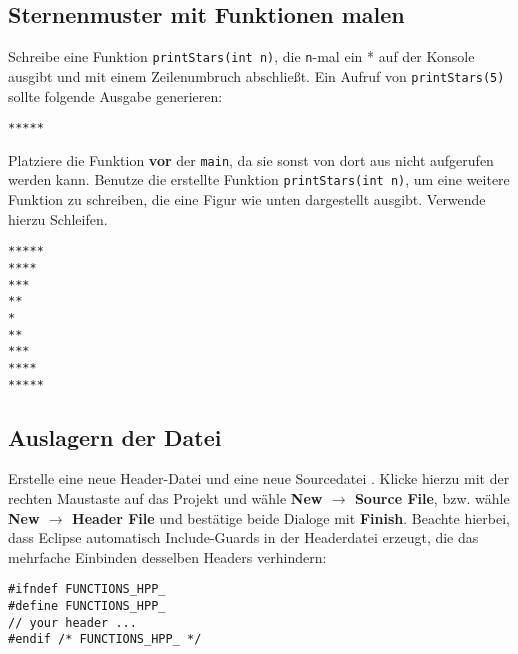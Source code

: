 \subsection{Sternenmuster mit Funktionen malen}

Schreibe eine Funktion \lstinline{printStars(int n)}, die \lstinline{n}-mal ein * auf der Konsole ausgibt und mit einem Zeilenumbruch abschließt.
Ein Aufruf von \lstinline{printStars(5)} sollte folgende Ausgabe generieren:

\begin{lstlisting}
*****
\end{lstlisting}

Platziere die Funktion \textbf{vor} der \lstinline{main}, da sie sonst von dort aus nicht aufgerufen werden kann.
Benutze die erstellte Funktion \lstinline{printStars(int n)}, um eine weitere Funktion zu schreiben, die eine Figur wie unten dargestellt ausgibt.
Verwende hierzu Schleifen.

\begin{lstlisting}
*****
****
***
**
*
**
***
****
*****
\end{lstlisting}


\subsection{Auslagern der Datei}
Erstelle eine neue Header-Datei  und eine neue
Sourcedatei .
Klicke hierzu mit der rechten Maustaste auf das Projekt und wähle \textbf{New $\rightarrow$ Source File}, bzw. wähle \textbf{New $\rightarrow$ Header File} und bestätige beide Dialoge mit \textbf{Finish}.
Beachte hierbei, dass Eclipse automatisch Include-Guards in der Headerdatei erzeugt, die das mehrfache Einbinden desselben Headers verhindern:

\begin{lstlisting}
#ifndef FUNCTIONS_HPP_
#define FUNCTIONS_HPP_
// your header ...
#endif /* FUNCTIONS_HPP_ */
\end{lstlisting}

